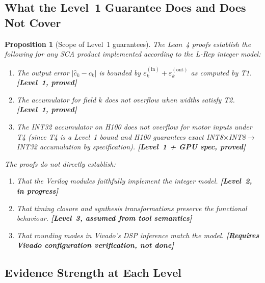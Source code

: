 \documentclass[11pt,a4paper]{article}
\theoremstyle{definition}
\theoremstyle{plain}
\newtheorem{proposition}{Proposition}[section]
\theoremstyle{remark}
\begin{document}
\subsection{What the Level~1 Guarantee Does and Does Not Cover}
\label{sec:scope-what}

\begin{proposition}[Scope of Level~1 guarantees]
\label{prop:scope}
The Lean~4 proofs establish the following for any SCA product implemented
\emph{according to the L-Rep integer model}:
\begin{enumerate}[label=(\roman*)]
  \item The output error $|\hat{c}_k - c_k|$ is bounded by
        $\varepsilon_k^{(\mathrm{in})} + \varepsilon_k^{(\mathrm{out})}$
        as computed by T1. \hfill\textbf{[Level~1, proved]}
  \item The accumulator for field $k$ does not overflow when widths
        satisfy T2. \hfill\textbf{[Level~1, proved]}
  \item The INT32 accumulator on H100 does not overflow for motor inputs
        under T4 (since T4 is a Level~1 bound and H100 guarantees
        exact INT8$\times$INT8$\rightarrow$INT32 accumulation by
        specification). \hfill\textbf{[Level~1 + GPU spec, proved]}
\end{enumerate}
The proofs do \emph{not} directly establish:
\begin{enumerate}[label=(\alph*)]
  \item That the Verilog modules faithfully implement the integer model.
        \hfill\textbf{[Level~2, in progress]}
  \item That timing closure and synthesis transformations preserve the
        functional behaviour.
        \hfill\textbf{[Level~3, assumed from tool semantics]}
  \item That rounding modes in Vivado's DSP inference match the model.
        \hfill\textbf{[Requires Vivado configuration verification, not done]}
\end{enumerate}
\end{proposition}

\subsection{Evidence Strength at Each Level}
\label{sec:gap3-evidence}
\end{document}
